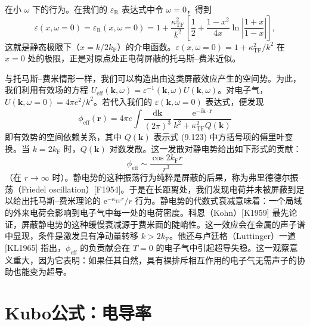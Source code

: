 在小 $\omega$ 下的行为。在我们的 $\varepsilon_{\mathrm{R}}$ 表达式中令 $\omega=0$，得到
\begin{equation*}
\varepsilon(x,\omega=0)=\varepsilon_{\mathrm{R}}(x,\omega=0)=1+\frac{\kappa_{\mathrm{TF}}^{2}}{k^{2}}\left[\frac{1}{2}+\frac{1-x^{2}}{4x}\ln\left|\frac{1+x}{1-x}\right|\right],
\tag{9.123}
\end{equation*}
这就是静态极限下（$x=k/2k_{\mathrm{F}}$）的介电函数。$\varepsilon(x,\omega=0)=1+\kappa_{\mathrm{TF}}^{2}/k^{2}$ 在 $x=0$ 处的极限，正是对原点处正电荷屏蔽的托马斯–费米近似。

与托马斯–费米情形一样，我们可以构造出由这类屏蔽效应产生的空间势。为此，我们利用有效场的方程 $U_{\mathrm{eff}}(\mathbf{k},\omega)=\varepsilon^{-1}(\mathbf{k},\omega)U(\mathbf{k},\omega)$。对电子气，$U(\mathbf{k},\omega=0)=4\pi e^{2}/k^{2}$。若代入我们的 $\varepsilon(\mathbf{k},\omega=0)$ 表达式，便发现
\begin{equation*}
\phi_{\mathrm{eff}}(\mathbf{r})=4\pi e\int\frac{\mathrm{d}\mathbf{k}}{(2\pi)^{3}}\,\frac{\mathrm{e}^{-\mathrm{i}\mathbf{k}\cdot\mathbf{r}}}{k^{2}+\kappa_{\mathrm{TF}}^{2}Q(\mathbf{k})}
\tag{9.124}
\end{equation*}
即有效势的空间依赖关系，其中 $Q(\mathbf{k})$ 表示式 (9.123) 中方括号项的傅里叶变换。当 $k=2k_{\mathrm{F}}$ 时，$Q(\mathbf{k})$ 对数发散。这一发散对静电势给出如下形式的贡献：
\begin{equation*}
\phi_{\mathrm{eff}}\sim\frac{\cos 2k_{\mathrm{F}}r}{r^{3}}
\tag{9.125}
\end{equation*}
（在 $r\to\infty$ 时）。静电势的这种振荡行为纯粹是屏蔽的后果，称为弗里德德尔振荡（Friedel oscillation）[F1954]。于是在长距离处，我们发现电荷并未被屏蔽到足以给出托马斯–费米理论的 $\mathrm{e}^{-\kappa_{\mathrm{TF}}r}/r$ 行为。静电势的代数式衰减意味着：一个局域的外来电荷会影响到电子气中每一处的电荷密度。科恩（Kohn）[K1959] 最先论证，屏蔽静电势的这种缓慢衰减源于费米面的陡峭性。这一效应会在金属的声子谱中显现，条件是激发具有净动量转移 $k>2k_{\mathrm{F}}$。他还与卢廷格（Luttinger）一道 [KL1965] 指出，$\phi_{\mathrm{eff}}$ 的负贡献会在 $T=0$ 的电子气中引起超导失稳。这一观察意义重大，因为它表明：如果任其自然，具有裸排斥相互作用的电子气无需声子的协助也能变为超导。

\section{Kubo公式：电导率}

